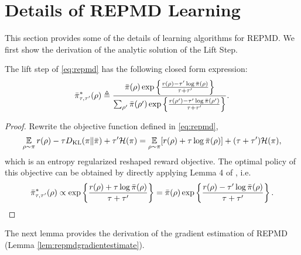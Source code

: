 \section{Details of REPMD Learning}
\label{appx:repmd-learning}

This section provides some of the details of learning algorithms for REPMD.
We first show the derivation of the analytic solution of the Lift Step.
\begin{lem}
	\label{lem:opt_pi_ref}
	The lift step of \cref{eq:repmd} has the following closed form expression:
	\begin{equation}
	\label{eq:pitautauprime1}
	\bar{\pi}_{\tau,\tau^{\prime}}^*(\rho) \triangleq \frac{\bar{\pi}(\rho) \exp\left\{ \frac{r(\rho)-\tau^{\prime} \log \bar{\pi}(\rho) }{ \tau+\tau^{\prime}} \right\}}{ \sum_{\rho^{\prime}}{\bar{\pi}(\rho^{\prime}) \exp\left\{ \frac{r(\rho^{\prime})-\tau^{\prime} \log \bar{\pi}(\rho^{\prime})}{ \tau+\tau^{\prime}} \right\} } }.
	\end{equation}
\end{lem}
\begin{proof}
	Rewrite the objective function defined in \cref{eq:repmd},
	\begin{equation}
	\operatorname*{\mathbb{E}}\limits_{\rho \sim \pi} r(\rho)  - \tau D_{\mathrm{KL}}(\pi \| \bar{\pi}) + \tau^{\prime} \mathcal{H}(\pi) = \operatorname*{\mathbb{E}}\limits_{\rho \sim \pi} [r(\rho) + \tau \log \bar{\pi}(\rho)] + (\tau+\tau^{\prime}) \mathcal{H}(\pi),
	\end{equation}
	which is an entropy regularized reshaped reward objective. The optimal policy of this objective can be obtained by directly applying Lemma 4 of \citet{nachum2017bridging}, i.e.
	\begin{equation}
	\label{pi_bar_star_tau_tauprime_prop_form}
	\bar{\pi}_{\tau,\tau^{\prime}}^*(\rho)\propto \exp\left\{ \frac{r(\rho)+\tau \log \bar{\pi}(\rho)}{\tau+\tau^{\prime}} \right\} = \bar{\pi}(\rho) \exp\left\{ \frac{r(\rho)-\tau^{\prime} \log \bar{\pi}(\rho)}{\tau+\tau^{\prime}} \right\}. \qedhere
	\end{equation}
\end{proof}
The next lemma provides the derivation of the gradient estimation of REPMD (Lemma \ref{lem:repmdgradientestimate}). 
